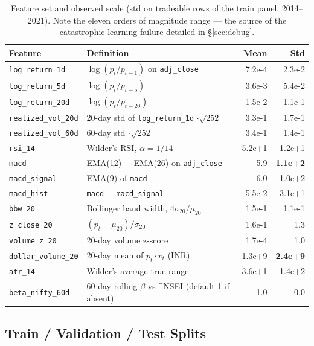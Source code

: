 \documentclass[11pt,a4paper]{article}
\begin{document}
\begin{table}[h]
\centering
\caption{Feature set and observed scale (std on tradeable rows of the train panel,
2014--2021). Note the eleven orders of magnitude range --- the source of the
catastrophic learning failure detailed in \S\ref{sec:debug}.}
\label{tab:features}
\small
\begin{tabularx}{\textwidth}{l X r r}
\toprule
\textbf{Feature} & \textbf{Definition} & \textbf{Mean} & \textbf{Std} \\
\midrule
\texttt{log\_return\_1d} & $\log(p_t / p_{t-1})$ on \texttt{adj\_close} & 7.2e-4 & 2.3e-2 \\
\texttt{log\_return\_5d} & $\log(p_t / p_{t-5})$ & 3.6e-3 & 5.4e-2 \\
\texttt{log\_return\_20d} & $\log(p_t / p_{t-20})$ & 1.5e-2 & 1.1e-1 \\
\texttt{realized\_vol\_20d} & 20-day std of \texttt{log\_return\_1d} $\cdot \sqrt{252}$ & 3.3e-1 & 1.7e-1 \\
\texttt{realized\_vol\_60d} & 60-day std $\cdot \sqrt{252}$ & 3.4e-1 & 1.4e-1 \\
\texttt{rsi\_14} & Wilder's RSI, $\alpha = 1/14$ & 5.2e+1 & 1.2e+1 \\
\texttt{macd} & EMA(12) $-$ EMA(26) on \texttt{adj\_close} & 5.9 & \textbf{1.1e+2} \\
\texttt{macd\_signal} & EMA(9) of \texttt{macd} & 6.0 & 1.0e+2 \\
\texttt{macd\_hist} & \texttt{macd} $-$ \texttt{macd\_signal} & -5.5e-2 & 3.1e+1 \\
\texttt{bbw\_20} & Bollinger band width, $4\sigma_{20}/\mu_{20}$ & 1.5e-1 & 1.1e-1 \\
\texttt{z\_close\_20} & $(p_t - \mu_{20}) / \sigma_{20}$ & 1.6e-1 & 1.3 \\
\texttt{volume\_z\_20} & 20-day volume z-score & 1.7e-4 & 1.0 \\
\texttt{dollar\_volume\_20} & 20-day mean of $p_t \cdot v_t$ (INR) & 1.3e+9 & \textbf{2.4e+9} \\
\texttt{atr\_14} & Wilder's average true range & 3.6e+1 & 1.4e+2 \\
\texttt{beta\_nifty\_60d} & 60-day rolling $\beta$ vs \^{}NSEI (default 1 if absent) & 1.0 & 0.0 \\
\bottomrule
\end{tabularx}
\end{table}

\subsection{Train / Validation / Test Splits}
\end{document}
